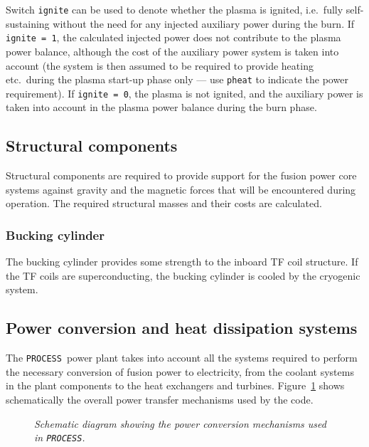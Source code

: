 \documentclass[11pt,a4paper]{report}
\newcommand{\process}{\mbox{\texttt{PROCESS}}}
\begin{document}
Switch \texttt{ignite} can be used to denote whether the plasma is ignited,
i.e.\ fully self-sustaining without the need for any injected auxiliary power
during the burn. If \texttt{ignite = 1}, the calculated injected power does not
contribute to the plasma power balance, although the cost of the auxiliary
power system is taken into account (the system is then assumed to be required to
provide heating etc.\ during the plasma start-up phase only --- use
\texttt{pheat} to indicate the power requirement). If
\texttt{ignite = 0}, the plasma is not ignited, and the auxiliary power is
taken into account in the plasma power balance during the burn phase.

\subsection{Structural components}

Structural components are required to provide support for the fusion power
core systems against gravity and the magnetic forces that will be encountered
during operation. The required structural masses and their costs are
calculated.

\subsubsection{Bucking cylinder}

The bucking cylinder provides some strength to the inboard TF coil
structure. If the TF coils are superconducting, the bucking cylinder is cooled
by the cryogenic system.

\subsection{Power conversion and heat dissipation systems}

The \process\ power plant takes into account all the systems required to
perform the necessary conversion of fusion power to electricity, from the
coolant systems in the plant components to the heat exchangers and turbines.
Figure~\ref{fig:pwrconv} shows schematically the overall power transfer
mechanisms used by the code.

\begin{figure}[tbph]
\centerline{}
\vspace{-12mm}
\caption[Power conversion mechanisms within \process]
{\label{fig:pwrconv}
  \textit{Schematic diagram showing the power conversion mechanisms used in
    \process \cite[Note 0166]{PWF}.}
}
\end{figure}
\end{document}
